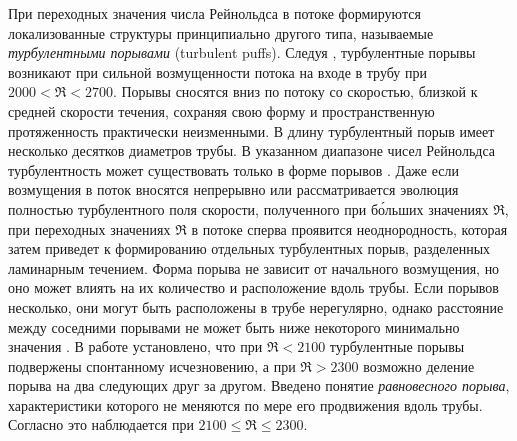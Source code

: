 При переходных значения числа Рейнольдса в потоке формируются локализованные структуры принципиально другого типа, называемые {\it турбулентными порывами} (turbulent puffs). Следуя \cite{Wygnanski1973}, турбулентные порывы возникают при сильной возмущенности потока на входе в трубу при $2000<\Re<2700$. Порывы сносятся вниз по потоку со скоростью, близкой к средней скорости течения, сохраняя свою форму и пространственную протяженность практически неизменными. В длину турбулентный порыв имеет несколько десятков диаметров трубы. В указанном диапазоне чисел Рейнольдса турбулентность может существовать только в форме порывов \cite{vanDoorne2009, Moxey2010, Samanta2011}. Даже если возмущения в поток вносятся непрерывно или рассматривается эволюция полностью турбулентного поля скорости, полученного при б\'{о}льших значениях $\Re$, при переходных значениях $\Re$ в потоке сперва проявится неоднородность, которая затем приведет к формированию отдельных турбулентных порыв, разделенных ламинарным течением. Форма порыва не зависит от начального возмущения, но оно может влиять на их количество и расположение вдоль трубы. Если порывов несколько, они могут быть расположены в трубе нерегулярно, однако расстояние между соседними порывами не может быть ниже некоторого минимально значения \cite{Samanta2011}. В работе \cite{Wygnanski1975} установлено, что при $\Re<2100$ турбулентные порывы подвержены спонтанному исчезновению, а при $\Re>2300$ возможно деление порыва на два следующих друг за другом. Введено понятие {\it равновесного порыва}, характеристики которого не меняются по мере его продвижения вдоль трубы. Согласно \cite{Wygnanski1975} это наблюдается при $2100\leqslant \Re \leqslant 2300$. 


